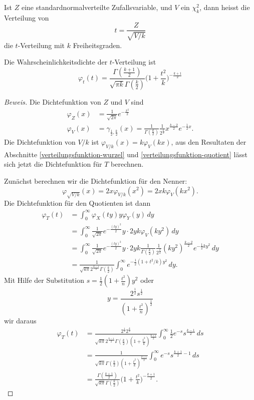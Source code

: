 \begin{definition}
Ist $Z$ eine standardnormalverteilte Zufallsvariable, und $V$ ein
$\chi_k^2$, dann heisst die Verteilung von
\[
t=\frac{Z}{\sqrt{V/k}}
\]
die $t$-Verteilung mit $k$ Freiheitsgraden.
\end{definition}

\begin{satz}Die Wahrscheinlichkeitsdichte der $t$-Verteilung ist
\begin{equation}
\varphi_t(t)=\frac{\Gamma(\frac{k+1}{2})}{\sqrt{\pi k}\Gamma(\frac{k}2)}
\biggl(1+\frac{t^2}{k}\biggr)^{-\frac{k+1}2}
\end{equation}
\end{satz}

\begin{proof}[Beweis]
Die Dichtefunktion von $Z$ und $V$ sind
\begin{align*}
\varphi_Z(x)
&=
\frac1{\sqrt{2\pi}}e^{-\frac{x^2}2}
\\
\varphi_V(x)
&=
\gamma_{\frac12,\frac{k}2}(x)=\frac1{\Gamma(\frac{k}2)}\frac1{2^\frac{k}2}x^{\frac{k-2}2}e^{-\frac12x}.
\end{align*}
Die Dichtefunktion von $V/k$ ist $\varphi_{V/k}(x)=k\varphi_V(kx)$, aus
den Resultaten der Abschnitte \ref{verteilungsfunktion-wurzel}
und \ref{verteilungsfunktion-quotient} lässt sich jetzt die
Dichtefunktion für $T$ berechnen.

Zunächst berechnen wir die Dichtefunktion für den Nenner:
\[
\varphi_{\sqrt{V/k}}(x)=2x\varphi_{V/k}(x^2)=2xk\varphi_V(kx^2).
\]
Die Dichtefunktion für den Quotienten ist dann
\begin{align*}
\varphi_T(t)
&=
\int_0^\infty \varphi_X(ty)y\varphi_Y(y)\,dy
\\
&=
\int_0^\infty \frac1{\sqrt{2\pi}}e^{-\frac{(ty)^2}2}y\cdot
2yk\varphi_V(ky^2)\,dy
\\
&=
\int_0^\infty \frac1{\sqrt{2\pi}}e^{-\frac{(ty)^2}2}y\cdot
2yk
\frac1{\Gamma(\frac{k}2)}\frac1{2^{\frac{k}2}}(ky^2)^{\frac{k-2}2}e^{-\frac12ky^2}
\,dy
\\
&=
\frac1{\sqrt{k\pi}2^{\frac{k-1}2}\Gamma(\frac{k}2)}
\int_0^\infty e^{-\frac12(1+t^2/k)y^2} \,dy.
\end{align*}
Mit Hilfe der Substitution $s=\frac12(1+\frac{t^2}n)y^2$
oder
\[
y=\frac{2^{\frac12}s^{\frac12}}{(1+\frac{t^2}n)^{\frac12}}
\]
wir daraus
\begin{align*}
\varphi_T(t)
&=
\frac{2^{\frac12}2^{\frac{k}2}}{\sqrt{k\pi}2^{\frac{k-1}2}\Gamma(\frac{k}2)(1+\frac{t^2}k)^{\frac{k+1}2}}
\int_0^\infty \frac12e^{-s}s^{\frac{k-1}2}\,ds
\\
&=
\frac{1}{\sqrt{k\pi}\Gamma(\frac{k}2)(1+\frac{t^2}k)^{\frac{k+1}2}}
\int_0^\infty e^{-s}s^{\frac{k+1}2-1}\,ds
\\
&=
\frac{\Gamma(\frac{k+1}2)}{\sqrt{k\pi}\Gamma(\frac{k}2)}\biggl(1+\frac{t^2}k\biggr)^{-\frac{k+1}2}.
\end{align*}

\end{proof}

